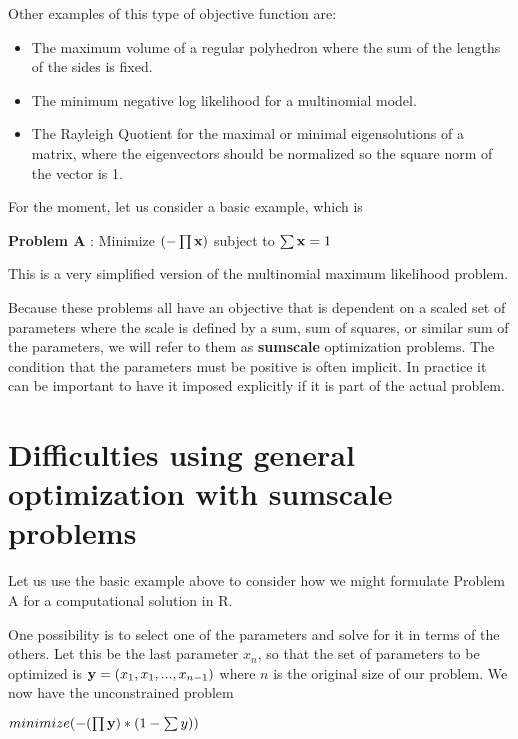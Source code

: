 \documentclass[11pt]{article}\usepackage[]{graphicx}\usepackage[]{color}
\newcommand{\B}[1]{{\bf #1 \rm}}
\newcommand{\R}{{\sf R}}
\begin{document}
Other examples of this type of objective function are:

\begin{itemize}
\item{The maximum volume  of a regular polyhedron where the sum of the lengths
of the sides is fixed.}
\item{The minimum negative log likelihood for a multinomial model.}
\item{The Rayleigh Quotient for the maximal or minimal eigensolutions of a matrix, where
the eigenvectors should be normalized so the square norm of the vector is 1.}
\end{itemize}

For the moment, let us consider a basic example, which is 
\vspace*{10pt}

\B{Problem A}: Minimize  $( - \prod{\B{x}})$ subject to $\sum{\B{x}}=1$
\vspace*{10pt}

This is a very simplified version of the multinomial maximum likelihood problem. 

Because these problems all have an objective that is dependent on a scaled set of parameters 
where the scale is defined by a sum, sum of squares, or similar sum of the parameters, we will
refer to them as \B{sumscale} optimization problems. The condition that the parameters
must be positive is often implicit. In practice it can be important to have it imposed
explicitly if it is part of the actual problem. 

\section{Difficulties using general optimization with sumscale problems}

Let us use the basic example above to consider how we might formulate Problem A for a
computational solution in \R. 

One possibility is to select one of the parameters and solve for it in 
terms of the others. Let this
be the last parameter $x_n$, so that the set of parameters to be 
optimized is $ \B{y} = (x_1, x_1, ..., x_{n-1})$ where 
$n$ is the original size of our problem. We now have the unconstrained problem
\vspace*{10pt}

$ minimize ( - (\prod{\B{y}}) * (1 - \sum{y} ) ) $
\end{document}
